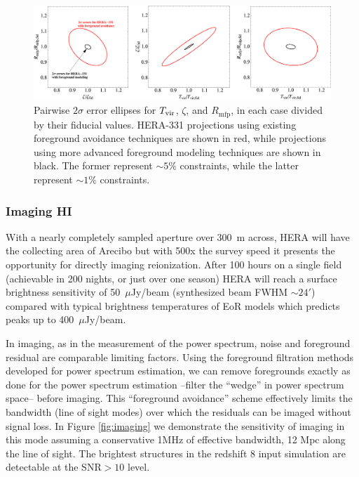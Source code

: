 \documentclass[preprint]{aastex}
\begin{document}
\begin{figure}[t]\centering
\includegraphics[width=\textwidth]{plots/Pspec/OPTMIDellipses.pdf}
\caption{Pairwise $2\sigma$ error ellipses for $T_{\rm vir}$, $\zeta$, and $R_\textrm{mfp}$, in each case divided by their fiducial values.  HERA-331 projections using existing foreground avoidance techniques are shown in red, while projections using more advanced foreground modeling techniques are shown in black.  The former represent $\sim 5\%$ constraints, while the latter represent $\sim 1\%$ constraints.\label{fig:ErrorEllipses}}
\end{figure}


\subsubsection{Imaging HI}
With a nearly completely sampled aperture over 300~m across, HERA will have the collecting area of Arecibo but 
with 500x the survey speed it presents the opportunity for directly imaging reionization.  After 100 hours on a 
single field (achievable in 200 nights, or just over one season) HERA will reach a surface brightness sensitivity 
of 50~$\mu$Jy/beam (synthesized beam FWHM $\sim 24'$) compared with typical brightness temperatures of EoR models 
which predicts peaks up to 400~$\mu$Jy/beam.

In imaging, as in the measurement of the power spectrum, noise and foreground residual are comparable limiting 
factors. Using the foreground filtration methods developed for power spectrum estimation, we can remove 
foregrounds exactly as done for the power spectrum estimation --filter the ``wedge'' in power spectrum 
space-- before imaging.  This ``foreground avoidance'' scheme effectively limits the bandwidth (line of sight 
modes) over which the residuals can be imaged without signal loss.  In Figure \ref{fig:imaging} we demonstrate the 
sensitivity of imaging in this mode assuming a conservative 1MHz of effective bandwidth, 12 Mpc along the line of 
sight.  The brightest structures in the redshift 8 input simulation are detectable at the SNR$>10$ level.
\end{document}
